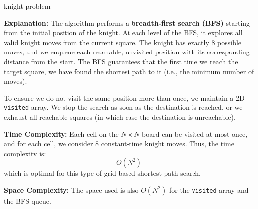 \begin{customsolutionbox}
    \begin{algorithm}[H]
        \caption{knight problem}
    \end{algorithm}

    \textbf{Explanation:} The algorithm performs a \textbf{breadth-first search (BFS)} starting from the initial position of the knight. At each level of the BFS, it explores all valid knight moves from the current square. The knight has exactly 8 possible moves, and we enqueue each reachable, unvisited position with its corresponding distance from the start. The BFS guarantees that the first time we reach the target square, we have found the shortest path to it (i.e., the minimum number of moves).

    To ensure we do not visit the same position more than once, we maintain a 2D \texttt{visited} array. We stop the search as soon as the destination is reached, or we exhaust all reachable squares (in which case the destination is unreachable).

        \textbf{Time Complexity:} Each cell on the $N \times N$ board can be visited at most once, and for each cell, we consider 8 constant-time knight moves. Thus, the time complexity is:
        \[
        O(N^2)
        \]
        which is optimal for this type of grid-based shortest path search.

        \textbf{Space Complexity:} The space used is also $O(N^2)$ for the \texttt{visited} array and the BFS queue.

\end{customsolutionbox}
